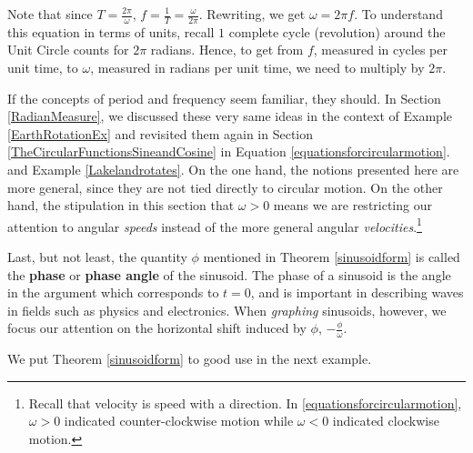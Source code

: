 \documentclass{ximera}
\begin{document}
Note that since $T = \frac{2 \pi}{\omega}$, $f = \frac{1}{T} = \frac{\omega}{2\pi}$.  Rewriting, we get $\omega = 2 \pi f$.  To understand  this equation in terms of units, recall $1$ complete cycle (revolution) around  the Unit Circle counts for $2\pi$ radians.  Hence,  to get from $f$, measured in cycles per unit time, to  $\omega$, measured in radians per unit time, we need to multiply by $2\pi$.



If the concepts of period and frequency seem familiar, they should.  In Section \ref{RadianMeasure}, we discussed these very same ideas in the context of Example \ref{EarthRotationEx} and revisited them again in Section \ref{TheCircularFunctionsSineandCosine} in Equation \ref{equationsforcircularmotion}. 
 and Example \ref{Lakelandrotates}.  On the one hand, the notions presented here are more general, since they are not tied directly to circular motion.  On the other hand, the stipulation in this section that $\omega > 0$ means we are restricting our attention to angular \textit{speeds} instead of the more general angular \textit{velocities}.\footnote{Recall that velocity is speed with a direction.  In  \ref{equationsforcircularmotion}, $\omega > 0$ indicated counter-clockwise motion while $\omega < 0$ indicated clockwise motion.}


Last, but not least, the quantity $\phi$ mentioned in Theorem \ref{sinusoidform} is called the \textbf{phase} or \textbf{phase angle} of the sinusoid. The phase of a sinusoid is the angle in the argument which corresponds to $t=0$, and is important in describing waves  in fields such as physics and electronics.  When \textit{graphing} sinusoids, however, we focus our attention on the horizontal shift induced by $\phi$, $-\frac{\phi}{\omega}$.



We put Theorem \ref{sinusoidform} to good use in the next example.
\end{document}

